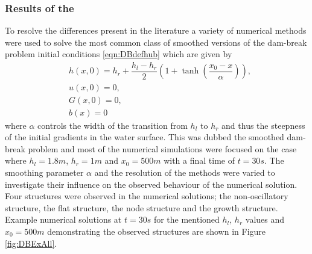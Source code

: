 \subsubsection{Results of the \citet{Pitt-2018-61}}
To resolve the differences present in the literature a variety of numerical methods were used to solve the most common class of smoothed versions of the dam-break problem initial conditions \eqref{eqn:DBdefhub} which are given by
\begin{subequations}
	\begin{align}
	&h(x,0) = h_r + \dfrac{h_l - h_r}{2} \left(1 +  \tanh\left(\dfrac{x_0 - x}{\alpha}\right) \right), \\
	&u(x,0) = 0 , \\
	&G(x,0) = 0 , \\
	&b(x) = 0
	\end{align}
	\label{eqn:SDBdefhub}
\end{subequations} 
where $\alpha$ controls the width of the transition from $h_l$ to $h_r$ and thus the steepness of the initial gradients in the water surface. This was dubbed the smoothed dam-break problem and most of the numerical simulations were focused on the case where $h_l = 1.8m$, $h_r = 1m$ and $x_0 = 500m$ with a final time of $t=30s$. The smoothing parameter $\alpha$ and the resolution of the methods were varied to investigate their influence on the observed behaviour of the numerical solution. Four structures were observed in the numerical solutions; the non-oscillatory structure, the flat structure, the node structure and the growth structure. Example numerical solutions at $t=30s$ for the mentioned $h_l$, $h_r$ values and $x_0 = 500m$ demonstrating the observed structures are shown in Figure \ref{fig:DBExAll}. 

